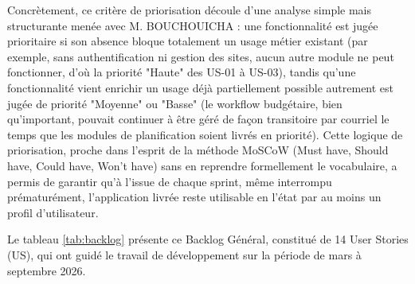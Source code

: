 Concrètement, ce critère de priorisation découle d'une analyse simple mais structurante menée avec M. BOUCHOUICHA : une fonctionnalité est jugée prioritaire si son absence bloque totalement un usage métier existant (par exemple, sans authentification ni gestion des sites, aucun autre module ne peut fonctionner, d'où la priorité "Haute" des US-01 à US-03), tandis qu'une fonctionnalité vient enrichir un usage déjà partiellement possible autrement est jugée de priorité "Moyenne" ou "Basse" (le workflow budgétaire, bien qu'important, pouvait continuer à être géré de façon transitoire par courriel le temps que les modules de planification soient livrés en priorité). Cette logique de priorisation, proche dans l'esprit de la méthode MoSCoW (Must have, Should have, Could have, Won't have) sans en reprendre formellement le vocabulaire, a permis de garantir qu'à l'issue de chaque sprint, même interrompu prématurément, l'application livrée reste utilisable en l'état par au moins un profil d'utilisateur.

Le tableau \ref{tab:backlog} présente ce Backlog Général, constitué de 14 User Stories (US), qui ont guidé le travail de développement sur la période de mars à septembre 2026.

